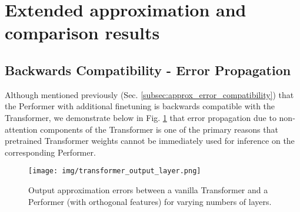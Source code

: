 \clearpage

\section{Extended approximation and comparison results}
\label{appendix:extended_approx}

\subsection{Backwards Compatibility - Error Propagation}
Although mentioned previously (Sec. \ref{subsec:approx_error_compatibility}) that the Performer with additional finetuning is backwards compatible with the Transformer, we demonstrate below in Fig. \ref{fig:appendix_approx} that error propagation due to non-attention components of the Transformer is one of the primary reasons that pretrained Transformer weights cannot be immediately used for inference on the corresponding Performer.

\begin{figure}[h]
  \centering
  \texttt{[image: img/transformer\_output\_layer.png]}
  \caption{Output approximation errors between a vanilla Transformer and a Performer (with orthogonal features) for varying numbers of layers.}
  \label{fig:appendix_approx}
\end{figure}

